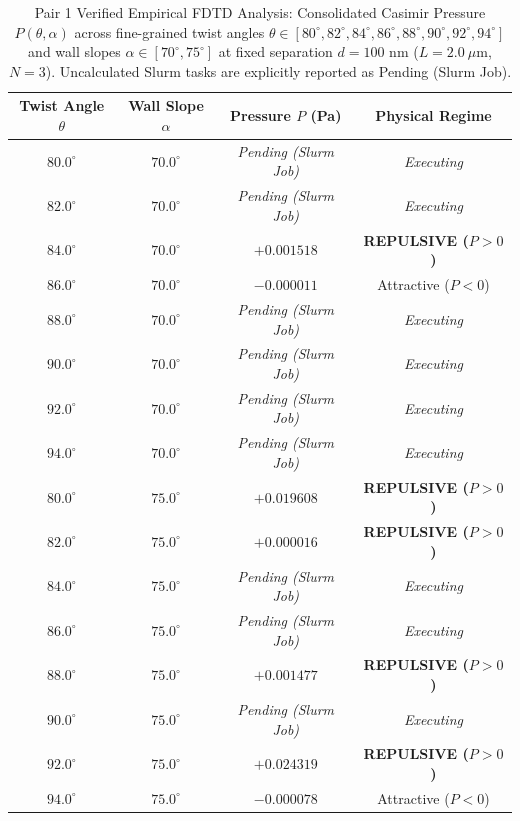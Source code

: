 \documentclass[12pt,letterpaper]{article}
\begin{document}
\begin{table}[h!]
\centering
\caption{Pair 1 Verified Empirical FDTD Analysis: Consolidated Casimir Pressure $P(\theta, \alpha)$ across fine-grained twist angles $\theta \in [80^\circ, 82^\circ, 84^\circ, 86^\circ, 88^\circ, 90^\circ, 92^\circ, 94^\circ]$ and wall slopes $\alpha \in [70^\circ, 75^\circ]$ at fixed separation $d = 100$ nm ($L=2.0\ \mu\text{m}$, $N=3$). Uncalculated Slurm tasks are explicitly reported as Pending (Slurm Job).}
\begin{tabular}{cccc}
\hline
\textbf{Twist Angle $\theta$} & \textbf{Wall Slope $\alpha$} & \textbf{Pressure $P$ (Pa)} & \textbf{Physical Regime} \\
\hline
$80.0^\circ$ & $70.0^\circ$ & \textit{Pending (Slurm Job)} & \textit{Executing} \\
$82.0^\circ$ & $70.0^\circ$ & \textit{Pending (Slurm Job)} & \textit{Executing} \\
$84.0^\circ$ & $70.0^\circ$ & $+0.001518$ & \textbf{REPULSIVE ($P>0$)} \\
$86.0^\circ$ & $70.0^\circ$ & $-0.000011$ & Attractive ($P<0$) \\
$88.0^\circ$ & $70.0^\circ$ & \textit{Pending (Slurm Job)} & \textit{Executing} \\
$90.0^\circ$ & $70.0^\circ$ & \textit{Pending (Slurm Job)} & \textit{Executing} \\
$92.0^\circ$ & $70.0^\circ$ & \textit{Pending (Slurm Job)} & \textit{Executing} \\
$94.0^\circ$ & $70.0^\circ$ & \textit{Pending (Slurm Job)} & \textit{Executing} \\
$80.0^\circ$ & $75.0^\circ$ & $+0.019608$ & \textbf{REPULSIVE ($P>0$)} \\
$82.0^\circ$ & $75.0^\circ$ & $+0.000016$ & \textbf{REPULSIVE ($P>0$)} \\
$84.0^\circ$ & $75.0^\circ$ & \textit{Pending (Slurm Job)} & \textit{Executing} \\
$86.0^\circ$ & $75.0^\circ$ & \textit{Pending (Slurm Job)} & \textit{Executing} \\
$88.0^\circ$ & $75.0^\circ$ & $+0.001477$ & \textbf{REPULSIVE ($P>0$)} \\
$90.0^\circ$ & $75.0^\circ$ & \textit{Pending (Slurm Job)} & \textit{Executing} \\
$92.0^\circ$ & $75.0^\circ$ & $+0.024319$ & \textbf{REPULSIVE ($P>0$)} \\
$94.0^\circ$ & $75.0^\circ$ & $-0.000078$ & Attractive ($P<0$) \\
\hline
\end{tabular}
\end{table}
\end{document}
